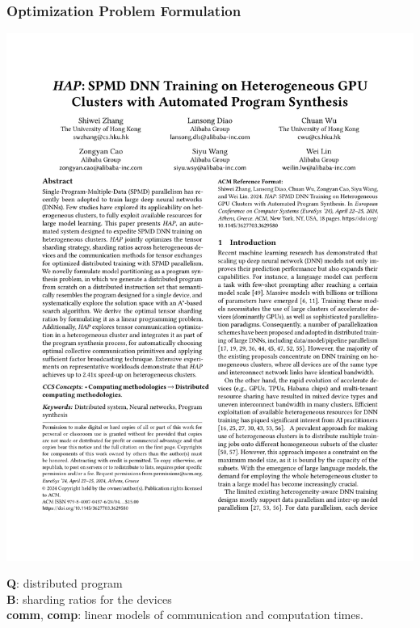 \documentclass[12pt,aspectratio=169]{beamer}
\begin{document}
    \begin{frame}
        \frametitle{Optimization Problem Formulation}

        \begin{center}
            \vspace{-1em}
            \includegraphics[page=10,trim=335.25bp 397.28bp 71.11bp 321.51bp,clip]{paper.pdf}
        \end{center}

        \textbf{Q}: distributed program \\
        \textbf{B}: sharding ratios for the devices \\
        \textbf{comm}, \textbf{comp}: linear models of communication and computation times.
    \end{frame}
\end{document}
